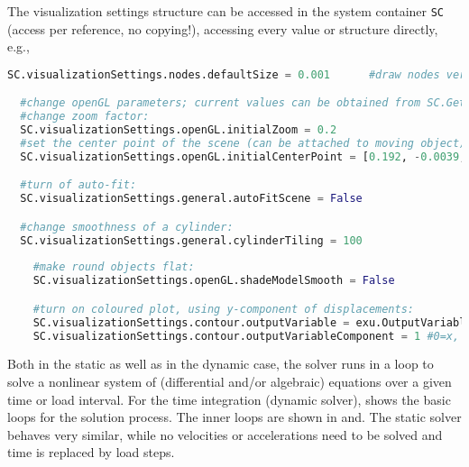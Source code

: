 The visualization settings structure can be accessed in the system container \texttt{SC} (access per reference, no copying!), accessing every value or structure directly, e.g.,
\pythonstyle
\begin{lstlisting}[language=Python, firstnumber=1]
  SC.visualizationSettings.nodes.defaultSize = 0.001      #draw nodes very small

  #change openGL parameters; current values can be obtained from SC.GetRenderState()
  #change zoom factor:
  SC.visualizationSettings.openGL.initialZoom = 0.2       
  #set the center point of the scene (can be attached to moving object):
  SC.visualizationSettings.openGL.initialCenterPoint = [0.192, -0.0039,-0.075]

  #turn of auto-fit:
  SC.visualizationSettings.general.autoFitScene = False

  #change smoothness of a cylinder:
  SC.visualizationSettings.general.cylinderTiling = 100
	
	#make round objects flat:
	SC.visualizationSettings.openGL.shadeModelSmooth = False

	#turn on coloured plot, using y-component of displacements:
	SC.visualizationSettings.contour.outputVariable = exu.OutputVariableType.Displacement
	SC.visualizationSettings.contour.outputVariableComponent = 1 #0=x, 1=y, 2=z
\end{lstlisting}

Both in the static as well as in the dynamic case, the solver runs in a loop to solve a nonlinear system of (differential and/or algebraic) equations over a given time or load interval.
For the time integration (dynamic solver),  shows the basic loops for the solution process. The inner loops are shown in  and.
The static solver behaves very similar, while no velocities or accelerations need to be solved and time is replaced by load steps.

